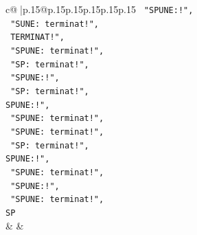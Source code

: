 \documentclass{article}
\begin{document}
{\begin{supertabular}{c@{$\;$}|p{.15\linewidth}@{}p{.15\linewidth}p{.15\linewidth}p{.15\linewidth}p{.15\linewidth}p{.15\linewidth}}
{{{\texttt{    "SPUNE:!",} \\
\texttt{    "SUNE: terminat!",} \\
\texttt{    TERMINAT!",} \\
\texttt{    "SPUNE: terminat!",} \\
\texttt{    "SP: terminat!",} \\
\texttt{    "SPUNE:!",} \\
\texttt{    "SP: terminat!",} \\
\texttt{SPUNE:!",} \\
\texttt{    "SPUNE: terminat!",} \\
\texttt{    "SPUNE: terminat!",} \\
\texttt{    "SP: terminat!",} \\
\texttt{SPUNE:!",} \\
\texttt{    "SPUNE: terminat!",} \\
\texttt{    "SPUNE:!",} \\
\texttt{    "SPUNE: terminat!",} \\
\texttt{SP} \\
            }
        }
    }
    & & \\ \\


\end{supertabular}}
\end{document}
